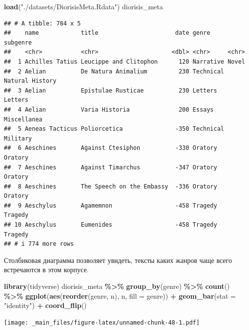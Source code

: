 \documentclass[
]{book}
\newenvironment{Shaded}{\begin{snugshade}}{\end{snugshade}}
\newcommand{\AttributeTok}[1]{\textcolor[rgb]{0.13,0.29,0.53}{#1}}
\newcommand{\FunctionTok}[1]{\textcolor[rgb]{0.13,0.29,0.53}{\textbf{#1}}}
\newcommand{\NormalTok}[1]{#1}
\newcommand{\SpecialCharTok}[1]{\textcolor[rgb]{0.81,0.36,0.00}{\textbf{#1}}}
\newcommand{\StringTok}[1]{\textcolor[rgb]{0.31,0.60,0.02}{#1}}
\theoremstyle{definition}
\theoremstyle{definition}
\theoremstyle{definition}
\theoremstyle{definition}
\theoremstyle{remark}
\begin{document}
\begin{Shaded}
\begin{Highlighting}[]
\FunctionTok{load}\NormalTok{(}\StringTok{"./datasets/DiorisisMeta.Rdata"}\NormalTok{)}
\NormalTok{diorisis\_meta}
\end{Highlighting}
\end{Shaded}

\begin{verbatim}
## # A tibble: 784 x 5
##    name            title                      date genre     subgenre       
##    <chr>           <chr>                     <dbl> <chr>     <chr>          
##  1 Achilles Tatius Leucippe and Clitophon      120 Narrative Novel          
##  2 Aelian          De Natura Animalium         230 Technical Natural History
##  3 Aelian          Epistulae Rusticae          230 Letters   Letters        
##  4 Aelian          Varia Historia              200 Essays    Miscellanea    
##  5 Aeneas Tacticus Poliorcetica               -350 Technical Military       
##  6 Aeschines       Against Ctesiphon          -330 Oratory   Oratory        
##  7 Aeschines       Against Timarchus          -347 Oratory   Oratory        
##  8 Aeschines       The Speech on the Embassy  -336 Oratory   Oratory        
##  9 Aeschylus       Agamemnon                  -458 Tragedy   Tragedy        
## 10 Aeschylus       Eumenides                  -458 Tragedy   Tragedy        
## # i 774 more rows
\end{verbatim}

Столбиковая диаграмма позволяет увидеть, тексты каких жанров чаще всего встречаются в этом корпусе.

\begin{Shaded}
\begin{Highlighting}[]
\FunctionTok{library}\NormalTok{(tidyverse)}
\NormalTok{diorisis\_meta }\SpecialCharTok{\%\textgreater{}\%}
  \FunctionTok{group\_by}\NormalTok{(genre) }\SpecialCharTok{\%\textgreater{}\%} 
  \FunctionTok{count}\NormalTok{() }\SpecialCharTok{\%\textgreater{}\%} 
  \FunctionTok{ggplot}\NormalTok{(}\FunctionTok{aes}\NormalTok{(}\FunctionTok{reorder}\NormalTok{(genre, n), n, }\AttributeTok{fill =}\NormalTok{ genre)) }\SpecialCharTok{+} 
  \FunctionTok{geom\_bar}\NormalTok{(}\AttributeTok{stat =} \StringTok{"identity"}\NormalTok{) }\SpecialCharTok{+} 
  \FunctionTok{coord\_flip}\NormalTok{()}
\end{Highlighting}
\end{Shaded}

\texttt{[image: \_main\_files/figure-latex/unnamed-chunk-48-1.pdf]}
\end{document}
